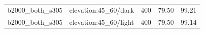 \begin{longtable}{l>{\raggedright\arraybackslash}p{.42\linewidth}rrr}
b2000\_\allowbreak{}both\_\allowbreak{}s305 & %
elevation:45\_\allowbreak{}60/dark & %
400 & %
79.50 & %
99.21 \\ %

b2000\_\allowbreak{}both\_\allowbreak{}s305 & %
elevation:45\_\allowbreak{}60/light & %
400 & %
79.50 & %
99.14 \\ %


\end{longtable}
